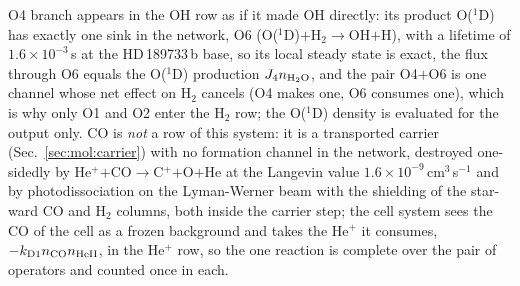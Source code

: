 O4 branch appears in the OH row as if it made OH directly: its product
O($^1$D) has exactly one sink in the network, O6
(O($^1$D)$+$H$_2\to$OH$+$H), with a lifetime of $1.6\times10^{-3}$\,s at the
HD\,189733\,b base, so its local steady state is exact, the flux through O6
equals the O($^1$D) production $J_4 n_{\rm H_2O}$, and the pair O4$+$O6 is
one channel whose net effect on H$_2$ cancels (O4 makes one, O6 consumes
one), which is why only O1 and O2 enter the H$_2$ row; the O($^1$D) density
is evaluated for the output only. CO is \emph{not} a row of this system: it
is a transported carrier (Sec.~\ref{sec:mol:carrier}) with no formation
channel in the network, destroyed one-sidedly by
He$^+$$+$CO$\to$C$^+$$+$O$+$He at the Langevin value
$1.6\times10^{-9}$\,cm$^{3}$\,s$^{-1}$ \citep[UMIST RATE22 entry
4068;][]{Millar2024} and by photodissociation on the Lyman-Werner beam with
the \citet{Visser2009} shielding of the star-ward CO and H$_2$ columns, both
inside the carrier step; the cell system sees the CO of the cell as a frozen
background and takes the He$^+$ it consumes, $-k_{\rm D1}n_{\rm CO}n_{\rm
HeII}$, in the He$^+$ row, so the one reaction is complete over the pair of
operators and counted once in each.

